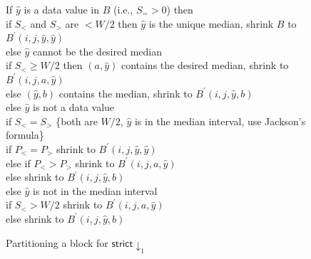\documentclass[11pt]{article}
\newlength{\Ainlength}
\newlength{\Aintemp}
\newcommand{\Ain}[1]{\setlength{\Aintemp}{0.5in}\addtolength{\Aintemp}{#1\Ainlength} \hspace*{\Aintemp}}
\begin{document}
\begin{figure}
\noindent
\Ain{0} If $\hat{y}$ is a data value in $B$ (i.e., $S_= > 0$) then\\
      \Ain{1} if $S_<$ and $S_>$ are $< W/2$ then $\hat{y}$ is the unique median, shrink $B$ to $B^\prime(i,j,\hat{y},\hat{y})$\\
      \Ain{1}else $\hat{y}$ cannot be the desired median\\
           \Ain{2} if $S_< \geq W/2$ then $(a,\hat{y})$ contains the desired median, shrink to $B^\prime(i,j,a,\hat{y})$ \\
           \Ain{2} else $(\hat{y},b)$ contains the median, shrink to $B^\prime(i,j,\hat{y}, b)$\\
\Ain{0} else $\hat{y}$ is not a data value\\
      \Ain{1}if $S_< = S_>$ \{both are $W/2$, $\hat{y}$ is in the median interval, use Jackson's formula\}\\
           \Ain{2} if $P_< = P_>$ shrink to $B^\prime(i,j,\hat{y},\hat{y})$\\
           \Ain{2} else if $P_<  > P_>$ shrink to $B^\prime(i,j,a,\hat{y})$\\
           \Ain{2} else shrink to $B^\prime(i,j,\hat{y},b)$\\
      \Ain{1} else $\hat{y}$ is not in the median interval\\
           \Ain{2} if $S_< > W/2$ shrink to $B^\prime(i,j,a,\hat{y})$ \\
           \Ain{2} else shrink to $B^\prime(i,j,\hat{y},b)$

\caption{Partitioning a block for $\mathsf{strict}{\downarrow}_1$}  \label{fig:partition}

\hrulefill
\end{figure}
\end{document}
